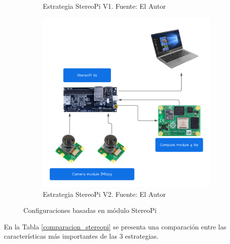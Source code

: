 \begin{figure}[H]
\begin{subfigure}[b]{0.4\textwidth}
        \caption[Estrategia StereoPi V1.]{Estrategia StereoPi V1. {\footnotesize Fuente: El Autor}}
        \label{estrategia_v1}
     \end{subfigure}
     \hfill
     \begin{subfigure}[b]{0.4\textwidth}
         \centering
        \includegraphics[scale=0.4]{Recursos/estrategia_stereopi_v2.png}
        \caption[Estrategia StereoPi V2.]{Estrategia StereoPi V2. {\footnotesize Fuente: El Autor}}
        \label{estrategia_v2}
     \end{subfigure}
     \hfill
\caption{Configuraciones basadas en módulo StereoPi}
\label{estrategias_stereopi}
\end{figure}
En la Tabla \ref{comparacion_stereopi} se presenta una comparación entre las características más importantes de las 3 estrategias.
